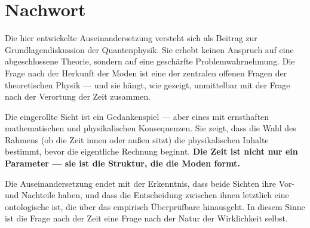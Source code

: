 \documentclass[11pt,a4paper]{article}
\begin{document}
\clearpage
{}
{}
\section*{Nachwort}

Die hier entwickelte Auseinandersetzung versteht sich als Beitrag zur Grundlagendiskussion der Quantenphysik. Sie erhebt keinen Anspruch auf eine abgeschlossene Theorie, sondern auf eine geschärfte Problemwahrnehmung. Die Frage nach der Herkunft der Moden ist eine der zentralen offenen Fragen der theoretischen Physik --- und sie hängt, wie gezeigt, unmittelbar mit der Frage nach der Verortung der Zeit zusammen.

Die eingerollte Sicht ist ein Gedankenspiel --- aber eines mit ernsthaften mathematischen und physikalischen Konsequenzen. Sie zeigt, dass die Wahl des Rahmens (ob die Zeit innen oder außen sitzt) die physikalischen Inhalte bestimmt, bevor die eigentliche Rechnung beginnt. \textbf{Die Zeit ist nicht nur ein Parameter --- sie ist die Struktur, die die Moden formt.}

Die Auseinandersetzung endet mit der Erkenntnis, dass beide Sichten ihre Vor- und Nachteile haben, und dass die Entscheidung zwischen ihnen letztlich eine ontologische ist, die über das empirisch Überprüfbare hinausgeht. In diesem Sinne ist die Frage nach der Zeit eine Frage nach der Natur der Wirklichkeit selbst.
\end{document}
